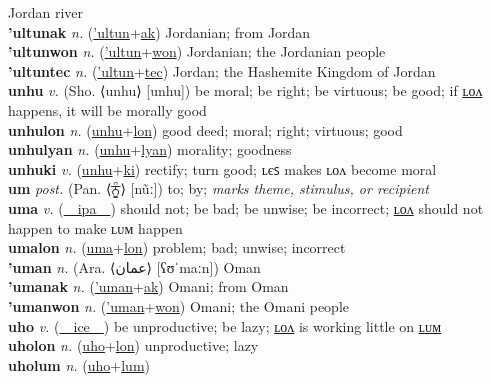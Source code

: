 Jordan river \label{'ultun} \\
\textbf{'ultunak} \textit{n.} (\hyperref['ultun]{'ultun}+\hyperref[ak]{ak})
Jordanian; from Jordan \label{'ultunak} \\
\textbf{'ultunwon} \textit{n.} (\hyperref['ultun]{'ultun}+\hyperref[won]{won})
Jordanian; the Jordanian people \label{'ultunwon} \\
\textbf{'ultuntec} \textit{n.} (\hyperref['ultun]{'ultun}+\hyperref[tec]{tec})
Jordan; the Hashemite Kingdom of Jordan \label{'ultuntec} \\
\textbf{unhu} \textit{v.} (Sho. ⟨unhu⟩ [unhu])
be moral; be right; be virtuous; be good; if \hyperref[unhulon]{ʟᴏᴧ} happens, it will be morally good \label{unhu} \\
\textbf{unhulon} \textit{n.} (\hyperref[unhu]{unhu}+\hyperref[lon]{lon})
good deed; moral; right; virtuous; good \label{unhulon} \\
\textbf{unhulyan} \textit{n.} (\hyperref[unhu]{unhu}+\hyperref[lyan]{lyan})
morality; goodness \label{unhulyan} \\
\textbf{unhuki} \textit{v.} (\hyperref[unhu]{unhu}+\hyperref[ki]{ki})
rectify; turn good; ʟєꜱ makes ʟᴏᴧ become moral \label{unhuki} \\
\textbf{um} \textit{post.} (Pan. ⟨ਨੂੰ⟩ [nũː])
to; by; \textit{marks theme, stimulus, or recipient} \label{um} \\
\textbf{uma} \textit{v.} (\hyperref[ipa]{~~ipa~~})
should not; be bad; be unwise; be incorrect; \hyperref[umalon]{ʟᴏᴧ} should not happen to make ʟᴜᴍ happen \label{uma} \\
\textbf{umalon} \textit{n.} (\hyperref[uma]{uma}+\hyperref[lon]{lon})
problem; bad; unwise; incorrect \label{umalon} \\
\textbf{'uman} \textit{n.} (Ara. ⟨عمان‎⟩ [ʕʊˈmaːn])
Oman \label{'uman} \\
\textbf{'umanak} \textit{n.} (\hyperref['uman]{'uman}+\hyperref[ak]{ak})
Omani; from Oman \label{'umanak} \\
\textbf{'umanwon} \textit{n.} (\hyperref['uman]{'uman}+\hyperref[won]{won})
Omani; the Omani people \label{'umanwon} \\
\textbf{uho} \textit{v.} (\hyperref[ice]{~~ice~~})
be unproductive; be lazy; \hyperref[uholon]{ʟᴏᴧ} is working little on \hyperref[uholum]{ʟᴜᴍ} \label{uho} \\
\textbf{uholon} \textit{n.} (\hyperref[uho]{uho}+\hyperref[lon]{lon})
unproductive; lazy \label{uholon} \\
\textbf{uholum} \textit{n.} (\hyperref[uho]{uho}+\hyperref[lum]{lum})
